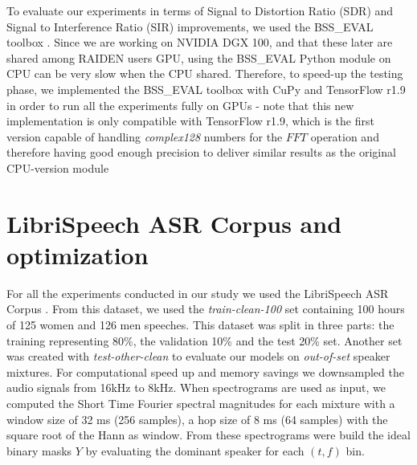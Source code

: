 \documentclass[master,final,11pt]{iscs-thesis}
\begin{document}
To evaluate our experiments in terms of Signal to Distortion Ratio (SDR) and Signal to Interference Ratio (SIR) improvements, we used the BSS\_EVAL toolbox \cite{BSS}. Since we are working on NVIDIA DGX 100, and that these later are shared among RAIDEN users GPU, using the BSS\_EVAL Python module on CPU can be  very slow when the CPU shared. Therefore, to speed-up the testing phase, we implemented the BSS\_EVAL toolbox with CuPy \cite{cupy} and TensorFlow r1.9 in order to run all the experiments fully on GPUs - note that this new implementation is only compatible with TensorFlow r1.9, which is the first version capable of handling \textit{complex128} numbers for the $FFT$ operation and therefore having good enough precision to deliver similar results as the original CPU-version module

\section{LibriSpeech ASR Corpus and optimization}

For all the experiments conducted in our study we used the LibriSpeech ASR Corpus \cite{LIBRI}. From this dataset, we used the \textit{train-clean-100} set containing 100 hours of 125 women and 126 men speeches. This dataset was split in three parts: the training representing 80\%, the validation 10\% and the test 20\% set. Another set was created with \textit{test-other-clean} to evaluate our models on \textit{out-of-set} speaker mixtures. For computational speed up and memory savings we downsampled the audio signals from 16kHz to 8kHz.
When spectrograms are used as input, we computed the Short Time Fourier spectral magnitudes for each mixture with a window size of 32 ms (256 samples), a hop size of 8 ms (64 samples) with the square root of the Hann as window. From these spectrograms were build the ideal binary masks $Y$ by evaluating the dominant speaker for each $(t,f)$ bin.
\end{document}
